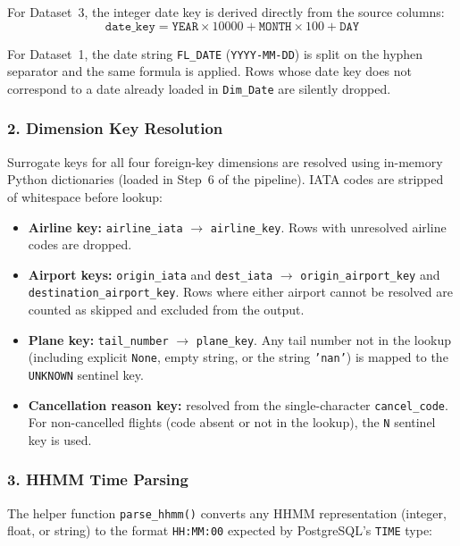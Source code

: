 \documentclass[12pt,a4paper]{article}
\begin{document}
For Dataset~3, the integer date key is derived directly from the source
columns:
\[
  \texttt{date\_key} = \texttt{YEAR} \times 10000 + \texttt{MONTH} \times 100 + \texttt{DAY}
\]

For Dataset~1, the date string \texttt{FL\_DATE} (\texttt{YYYY-MM-DD}) is
split on the hyphen separator and the same formula is applied. Rows whose
date key does not correspond to a date already loaded in \texttt{Dim\_Date}
are silently dropped.

\subsubsection*{2. Dimension Key Resolution}

Surrogate keys for all four foreign-key dimensions are resolved using
in-memory Python dictionaries (loaded in Step~6 of the pipeline). IATA codes
are stripped of whitespace before lookup:

\begin{itemize}
    \item \textbf{Airline key:} \texttt{airline\_iata} $\to$ \texttt{airline\_key}. Rows
          with unresolved airline codes are dropped.
    \item \textbf{Airport keys:} \texttt{origin\_iata} and \texttt{dest\_iata}
          $\to$ \texttt{origin\_airport\_key} and
          \texttt{destination\_airport\_key}. Rows where either airport
          cannot be resolved are counted as skipped and excluded from the
          output.
    \item \textbf{Plane key:} \texttt{tail\_number} $\to$ \texttt{plane\_key}.
          Any tail number not in the lookup (including explicit \texttt{None},
          empty string, or the string \texttt{'nan'}) is mapped to the
          \texttt{UNKNOWN} sentinel key.
    \item \textbf{Cancellation reason key:} resolved from the single-character
          \texttt{cancel\_code}. For non-cancelled flights (code absent or not
          in the lookup), the \texttt{N} sentinel key is used.
\end{itemize}

\subsubsection*{3. HHMM Time Parsing}

The helper function \texttt{parse\_hhmm()} converts any HHMM representation
(integer, float, or string) to the format \texttt{HH:MM:00} expected by
PostgreSQL's \texttt{TIME} type:
\end{document}
